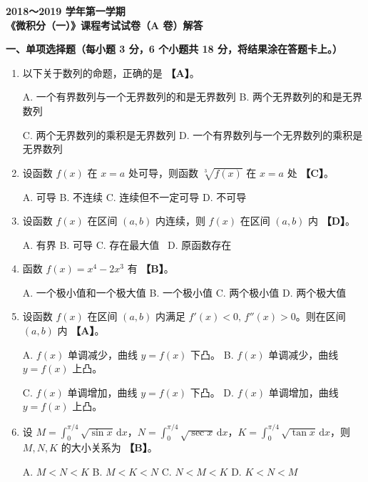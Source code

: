 \documentclass[a4paper,11pt]{ctexart}
\newcommand{\dd}{\,\mathrm{d}}
\begin{document}
\begin{center}
  {\Large\bfseries 2018～2019 学年第一学期}\\[0.5em]
  {\Large\bfseries 《微积分（一）》课程考试试卷（A 卷）解答}
\end{center}

\vspace{0.8em}

\textbf{一、单项选择题（每小题 3 分，6 个小题共 18 分，将结果涂在答题卡上。）}

\begin{enumerate}[label=\arabic*., leftmargin=2em, itemsep=0.7em, topsep=0.6em]
  \item 以下关于数列的命题，正确的是 \textbf{【A】}。

  A. 一个有界数列与一个无界数列的和是无界数列 \quad
  B. 两个无界数列的和是无界数列

  C. 两个无界数列的乘积是无界数列 \quad
  D. 一个有界数列与一个无界数列的乘积是无界数列

  \item 设函数 $f(x)$ 在 $x=a$ 处可导，则函数 $\sqrt[3]{f(x)}$ 在 $x=a$ 处 \textbf{【C】}。

  A. 可导 \qquad\quad
  B. 不连续 \qquad\quad
  C. 连续但不一定可导 \qquad\quad
  D. 不可导

  \item 设函数 $f(x)$ 在区间 $(a,b)$ 内连续，则 $f(x)$ 在区间 $(a,b)$ 内 \textbf{【D】}。

  A. 有界 \qquad\quad
  B. 可导 \qquad\quad
  C. 存在最大值 \qquad\qquad\quad\ 
  D. 原函数存在

  \item 函数 $f(x)=x^4-2x^3$ 有 \textbf{【B】}。

  A. 一个极小值和一个极大值 \qquad
  B. 一个极小值 \qquad
  C. 两个极小值 \qquad
  D. 两个极大值

  \item 设函数 $f(x)$ 在区间 $(a,b)$ 内满足 $f'(x)<0,\,f''(x)>0$。则在区间 $(a,b)$ 内 \textbf{【A】}。

  A. $f(x)$ 单调减少，曲线 $y=f(x)$ 下凸。 \qquad
  B. $f(x)$ 单调减少，曲线 $y=f(x)$ 上凸。

  C. $f(x)$ 单调增加，曲线 $y=f(x)$ 下凸。 \qquad
  D. $f(x)$ 单调增加，曲线 $y=f(x)$ 上凸。

  \item 设 $M=\displaystyle\int_0^{\pi/4}\sqrt{\sin x}\dd x$，$N=\displaystyle\int_0^{\pi/4}\sqrt{\sec x}\dd x$，$K=\displaystyle\int_0^{\pi/4}\sqrt{\tan x}\dd x$，则 $M,N,K$ 的大小关系为 \textbf{【B】}。

  A. $M<N<K$ \qquad\quad
  B. $M<K<N$ \qquad\quad
  C. $N<M<K$ \qquad\quad
  D. $K<N<M$
\end{enumerate}
\end{document}

